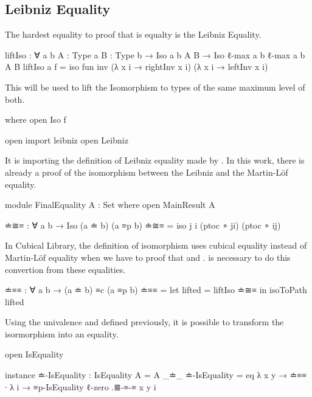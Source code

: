 \documentclass{article}
\begin{document}
\subsection{Leibniz Equality}

The hardest equality to proof that is equalty is the Leibniz Equality.

\begin{code}
liftIso : ∀ {a b} {A : Type a} {B : Type b}
  → Iso {a} {b} A B → Iso {ℓ-max a b} {ℓ-max a b} A B
liftIso {a} f = iso fun inv
  (λ x i → rightInv x i) (λ x i → leftInv x i)
\end{code}

This  will be used to lift the Isomorphism to types of the same maximum level of both.

\begin{code}
  where open Iso f

open import leibniz
open Leibniz
\end{code}

It is importing the definition of Leibniz equality made by \cite{abel2020leibniz}.
In this work, there is already a proof of the isomorphism between the Leibniz and the Martin-Löf equality.

\begin{code}
module FinalEquality {A : Set} where
  open MainResult A

  ≐≅≡ : ∀ {a b} → Iso (a ≐ b) (a ≡p b)
  ≐≅≡ = iso j i (ptoc ∘ ji) (ptoc ∘ ij)
\end{code}

In Cubical Library, the definition of isomorphism uses cubical equality instead of Martin-Löf equality
when we have to proof that  and .
 is necessary to do this convertion from these equalities.

\begin{code}
  ≐≡≡ : ∀ {a b} → (a ≐ b) ≡c (a ≡p b)
  ≐≡≡ = let lifted = liftIso ≐≅≡  in isoToPath lifted
\end{code}

Using the univalence and  defined previously, it is possible to transform the isormorphism
into an equality.

\begin{code}
  open IsEquality

  instance
    ≐-IsEquality : IsEquality {A = A} _≐_
    ≐-IsEquality = eq λ {x} {y} → ≐≡≡ ∙
      λ i → ≡p-IsEquality {ℓ-zero} .≣-≡-≡ {x} {y} i
\end{code}
\end{document}
